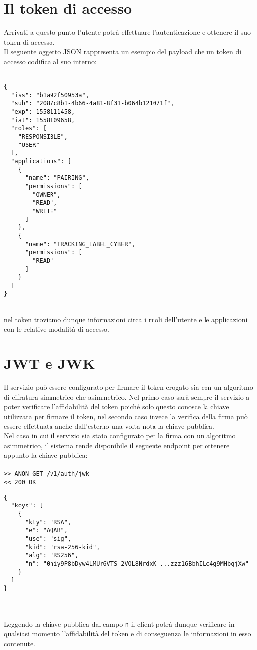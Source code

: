 \documentclass[a4paper,12pt]{article}
\begin{document}
\section{Il token di accesso}
Arrivati a questo punto l’utente potrà effettuare l’autenticazione e ottenere il suo token di accesso.\\

Il seguente oggetto JSON rappresenta un esempio del payload che un token di accesso codifica al suo interno:\\
\
\begin{lstlisting}
{
  "iss": "b1a92f50953a",
  "sub": "2087c8b1-4b66-4a81-8f31-b064b121071f",
  "exp": 1558111458,
  "iat": 1558109658,
  "roles": [
    "RESPONSIBLE",
    "USER"
  ],
  "applications": [
    {
      "name": "PAIRING",
      "permissions": [
        "OWNER",
        "READ",
        "WRITE"
      ]
    },
    {
      "name": "TRACKING_LABEL_CYBER",
      "permissions": [
        "READ"
      ]
    }
  ]
}
\end{lstlisting} \\
nel token troviamo dunque informazioni circa i ruoli dell’utente e le applicazioni con le relative modalità di accesso.

\section{JWT e JWK}
Il servizio può essere configurato per firmare il token erogato sia con un algoritmo di cifratura simmetrico che asimmetrico. Nel primo caso sarà sempre il servizio a poter verificare l’affidabilità del token poiché solo questo conosce la chiave utilizzata per firmare il token, nel secondo caso invece la verifica della firma può essere effettuata anche dall’esterno una volta nota la chiave pubblica.\\

Nel caso in cui il servizio sia stato configurato per la firma con un algoritmo asimmetrico, il sistema rende disponibile il seguente endpoint per ottenere appunto la chiave pubblica:\\
\\
\texttt{>> ANON GET /v1/auth/jwk}\\
\texttt{<< 200 OK}
\begin{lstlisting}
{
  "keys": [
    {
      "kty": "RSA",
      "e": "AQAB",
      "use": "sig",
      "kid": "rsa-256-kid",
      "alg": "RS256",
      "n": "0niy9P8bDyw4LMUr6VTS_2VOL8NrdxK-...zzz16BbhILc4g9MHbqjXw"
    }
  ]
}
\end{lstlisting}\\
\\
Leggendo la chiave pubblica dal campo \texttt{n} il client potrà dunque verificare in qualsiasi momento l'affidabilità del token e di conseguenza le informazioni in esso contenute.\\ \\
\


\end{document}
